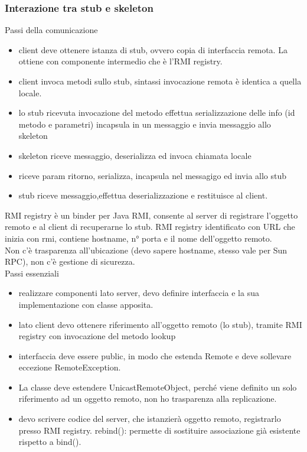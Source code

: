 \documentclass{article}
\begin{document}
\subsubsection{Interazione tra stub e skeleton}
Passi della comunicazione
\begin{itemize}
\item client deve ottenere istanza di stub, ovvero copia di interfaccia remota. La ottiene con componente intermedio che è l'RMI registry.
\item client invoca metodi sullo stub, sintassi invocazione remota è identica a quella locale.
\item lo stub ricevuta invocazione del metodo effettua serializzazione delle info (id metodo e parametri) incapsula in un messaggio e invia messaggio allo skeleton
\item skeleton riceve messaggio, deserializza ed invoca chiamata locale
\item riceve param ritorno, serializza, incapsula nel messagigo ed invia allo stub
\item stub riceve messaggio,effettua deserializzazione e restituisce al client.
\end{itemize}
RMI registry è un binder per Java RMI, consente al server di registrare l'oggetto remoto e al client di recuperarne lo stub. RMI registry identificato con URL che inizia con rmi, contiene hostname, n° porta e il nome dell'oggetto remoto.\\ Non c'è trasparenza all'ubicazione (devo sapere hostname, stesso vale per Sun RPC), non c'è gestione di sicurezza.\\ Passi essenziali
\begin{itemize}
\item realizzare componenti lato server, devo definire interfaccia e la sua implementazione con classe apposita.
\item lato client devo ottenere riferimento all'oggetto remoto (lo stub), tramite RMI registry con invocazione del metodo lookup
\item interfaccia deve essere public, in modo che estenda Remote e deve sollevare eccezione RemoteException.
\item La classe deve estendere UnicastRemoteObject, perché viene definito un solo riferimento ad un oggetto remoto, non ho trasparenza alla replicazione.
\item devo scrivere codice del server, che istanzierà oggetto remoto, registrarlo presso RMI registry. rebind(): permette di sostituire associazione già esistente rispetto a bind().
\end{itemize}
\end{document}
